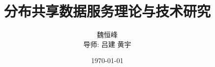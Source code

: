 \documentclass[shownotes]{beamer}
\title[分布共享数据服务理论与技术研究]{分布共享数据服务理论与技术研究}
\subtitle{}
\author[魏恒峰]{魏恒峰 \\导师: 吕建 \hspace{0.20cm} 黄宇}
\institute{南京大学软件所}
\date{\today}
\theoremstyle{plain}
\begin{document}
\renewcommand\figurename{图} 
\renewcommand\tablename{表} 

\maketitle






\end{document}

